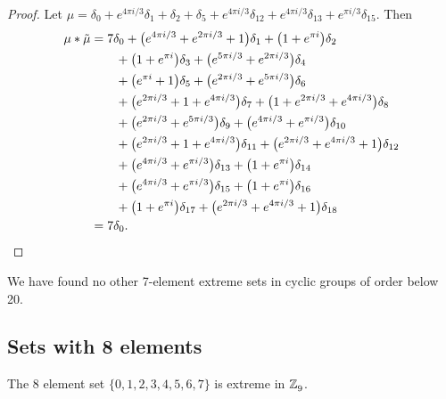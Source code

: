 \begin{proof} 
Let $\mu =\delta_{0}  +   e^{ 4\pi i  / 3}\delta_{1}  +  \delta_{2}  +  \delta_{5}  +   e^{ 4\pi i  / 3}\delta_{12}  +   e^{ 4\pi i  / 3}\delta_{13}  +   e^{\pi i / 3}\delta_{15}.$
Then
\begin{align*} \mu*\tilde \mu &=
7\delta_{0}   +  \big( e^{ 4 \pi i / 3}+ e^{ 2 \pi i / 3}+ 1\big)\delta_{1} 
  +  \big( 1+ e^{\pi i }\big)\delta_{2} 
  \\& \qquad +  \big( 1+ e^{\pi i }\big)\delta_{3} 
   +  \big( e^{ 5 \pi i / 3}+ e^{ 2 \pi i / 3}\big)\delta_{4} \\& \qquad +  \big( e^{\pi i }+ 1\big)\delta_{5} 
   +  \big( e^{ 2 \pi i / 3}+ e^{ 5 \pi i / 3}\big)\delta_{6} \\& \qquad +  \big( e^{ 2 \pi i / 3}+ 1+ e^{ 4 \pi i / 3}\big)\delta_{7} 
    +  \big( 1+ e^{ 2 \pi i / 3}+ e^{ 4 \pi i / 3}\big)\delta_{8} \\& \qquad +  \big( e^{ 2 \pi i / 3}+ e^{ 5 \pi i / 3}\big)\delta_{9}
      +  \big( e^{ 4 \pi i / 3}+ e^{\pi i / 3}\big)\delta_{10} \\& \qquad +  \big( e^{ 2 \pi i / 3}+ 1+ e^{ 4 \pi i / 3}\big)\delta_{11}
 +  \big( e^{ 2 \pi i / 3}+ e^{ 4 \pi i / 3}+ 1\big)\delta_{12} \\& \qquad +  \big( e^{ 4 \pi i / 3}+ e^{\pi i / 3}\big)\delta_{13} 
   +  \big( 1+ e^{\pi i }\big)\delta_{14} \\& \qquad +  \big( e^{ 4 \pi i / 3}+ e^{\pi i / 3}\big)\delta_{15} 
     +  \big( 1+ e^{\pi i }\big)\delta_{16} \\& \qquad +  \big( 1+ e^{\pi i }\big)\delta_{17} 
       +  \big( e^{ 2 \pi i / 3}+ e^{ 4 \pi i / 3}+ 1\big)\delta_{18} 
       \\&= 7\delta_0.  \qedhere
\end{align*}
\end{proof}

We have found no other 7-element extreme sets in cyclic groups of order below 20.
\subsection{Sets with 8 elements}
\begin{prop}\label{prop8inZ9}
The 8 element set $\{0,  1,  2,  3,  4,  5,  6,  7 \}$ is extreme in $\texttt{$\mathbb Z_{9}^{\,}$}$. \newline \end{prop} 


